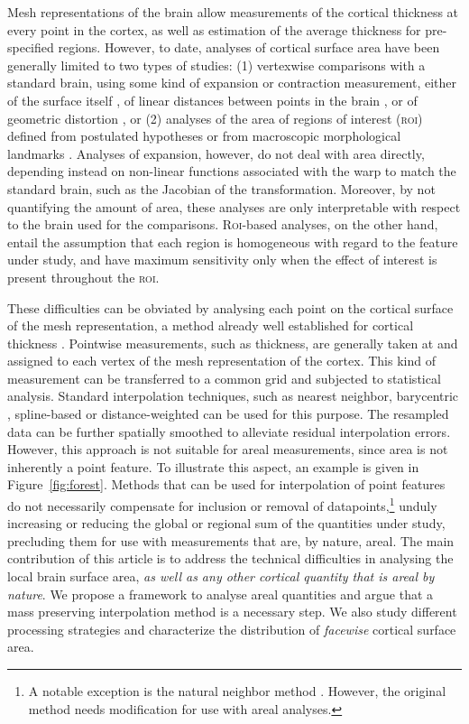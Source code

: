 Mesh representations of the brain allow measurements of the cortical thickness at every point in the cortex, as well as estimation of the average thickness for pre-specified regions. However, to date, analyses of cortical surface area have been generally limited to two types of studies: (1) vertexwise comparisons with a standard brain, using some kind of expansion or contraction measurement, either of the surface itself \citep{Joyner2009, Lyttelton2009, Hill2010, Rimol2010b, Palaniyappan2011}, of linear distances between points in the brain \citep{Sun2009a, Sun2009}, or of geometric distortion \citep{Wisco2007}, or (2) analyses of the area of regions of interest (\textsc{roi}) defined from postulated hypotheses or from macroscopic morphological landmarks \citep{Dickerson2009, Nopoulos2010, Kahler2011, Durazzo2011, Schwarzkopf2011, Eyler2011, Chen2011_neuron, Chen2012}. Analyses of expansion, however, do not deal with area directly, depending instead on non-linear functions associated with the warp to match the standard brain, such as the Jacobian of the transformation. Moreover, by not quantifying the amount of area, these analyses are only interpretable with respect to the brain used for the comparisons. R\textsc{oi}-based analyses, on the other hand, entail the assumption that each region is homogeneous with regard to the feature under study, and have maximum sensitivity only when the effect of interest is present throughout the \textsc{roi}.

These difficulties can be obviated by analysing each point on the cortical surface of the mesh representation, a method already well established for cortical thickness \citep{Fischl2000}. Pointwise measurements, such as thickness, are generally taken at and assigned to each vertex of the mesh representation of the cortex. This kind of measurement can be transferred to a common grid and subjected to statistical analysis. Standard interpolation techniques, such as nearest neighbor, barycentric \citep{Yiu2000}, spline-based \citep{DeBoor1962} or distance-weighted \citep{Shepard1968} can be used for this purpose. The resampled data can be further spatially smoothed to alleviate residual interpolation errors. However, this approach is not suitable for areal measurements, since area is not inherently a point feature. To illustrate this aspect, an example is given in Figure~\ref{fig:forest}. Methods that can be used for interpolation of point features do not necessarily compensate for inclusion or removal of datapoints,\footnote{A notable exception is the natural neighbor method \citep{Sibson1981}. However, the original method needs modification for use with areal analyses.} unduly increasing or reducing the global or regional sum of the quantities under study, precluding them for use with measurements that are, by nature, areal. The main contribution of this article is to address the technical difficulties in analysing the local brain surface area, \emph{as well as any other cortical quantity that is areal by nature}. We propose a framework to analyse areal quantities and argue that a mass preserving interpolation method is a necessary step. We also study different processing strategies and characterize the distribution of \emph{facewise} cortical surface area.

